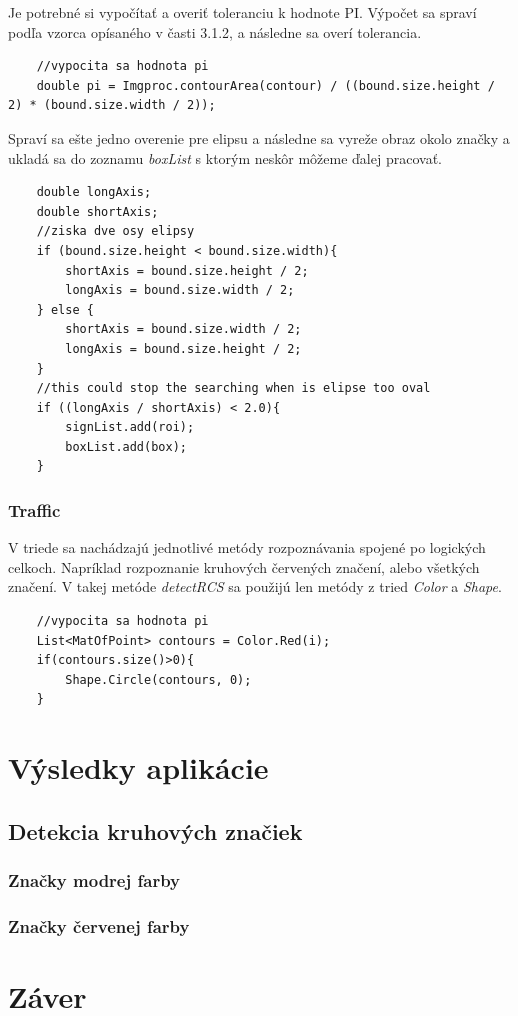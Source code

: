 \documentclass[12pt]{article}
\begin{document}
Je potrebné si vypočítať a overiť toleranciu k hodnote PI. Výpočet sa spraví podľa vzorca opísaného v časti 3.1.2, a následne sa overí tolerancia.
\begin{lstlisting}
	//vypocita sa hodnota pi
	double pi = Imgproc.contourArea(contour) / ((bound.size.height / 2) * (bound.size.width / 2));
\end{lstlisting}
Spraví sa ešte jedno overenie pre elipsu a následne sa vyreže obraz okolo značky a ukladá sa do zoznamu \emph{boxList} s ktorým neskôr môžeme ďalej pracovať.
\begin{lstlisting}
	double longAxis;
	double shortAxis;
	//ziska dve osy elipsy
	if (bound.size.height < bound.size.width){
		shortAxis = bound.size.height / 2;
		longAxis = bound.size.width / 2;
	} else {
		shortAxis = bound.size.width / 2;
		longAxis = bound.size.height / 2;
	}
	//this could stop the searching when is elipse too oval 
	if ((longAxis / shortAxis) < 2.0){
		signList.add(roi);
		boxList.add(box);
	}
\end{lstlisting}
\subsubsection{Traffic}
V triede sa nachádzajú jednotlivé metódy rozpoznávania spojené po logických celkoch. Napríklad rozpoznanie kruhových červených značení, alebo všetkých značení.
V takej metóde \emph{detectRCS} sa použijú len metódy z tried \emph{Color} a \emph{Shape}.
\begin{lstlisting}
	//vypocita sa hodnota pi
	List<MatOfPoint> contours = Color.Red(i);
	if(contours.size()>0){
		Shape.Circle(contours, 0);
	}
\end{lstlisting}
\section{Výsledky aplikácie}
\subsection{Detekcia kruhových značiek}
\subsubsection{Značky modrej farby}
\subsubsection{Značky červenej farby}

\clearpage
\section*{Záver}
\clearpage



\end{document}
